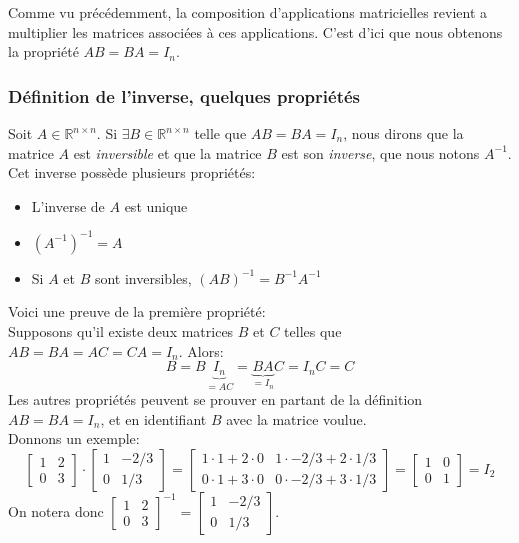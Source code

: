 \documentclass{article}
\newcommand{\R}{\mathbb{R}}
\newcommand{\cross}{\times}
\begin{document}
\noindent Comme vu précédemment, la composition d'applications matricielles revient a multiplier les matrices associées à ces applications. C'est d'ici que nous obtenons la propriété $AB=BA = I_n$.

\subsubsection{Définition de l'inverse, quelques propriétés}
\noindent Soit $A \in \R^{n \cross n}$. Si $\exists B \in \R^{n \cross n}$ telle que $AB=BA=I_n$, nous dirons que la matrice $A$ est \textit{inversible} et que la matrice $B$ est son \textit{inverse}, que nous notons $A^{-1}$. \\

\noindent Cet inverse possède plusieurs propriétés:
\begin{itemize}
    \item L'inverse de $A$ est unique
    \item $(A^{-1})^{-1} = A$
    \item Si $A$ et $B$ sont inversibles, $(AB)^{-1} = B^{-1} A^{-1}$
\end{itemize}

\noindent Voici une preuve de la première propriété:\\
Supposons qu'il existe deux matrices $B$ et $C$ telles que $AB=BA=AC=CA=I_n$. Alors:
$$B = B\underbrace{I_n}_{=AC} = \underbrace{BA}_{=I_n}C = I_n C = C$$
Les autres propriétés peuvent se prouver en partant de la définition $AB=BA=I_n$, et en identifiant $B$ avec la matrice voulue. \\

\noindent Donnons un exemple:
$$\begin{bmatrix} 1 & 2 \\ 0 & 3 \end{bmatrix} \cdot \begin{bmatrix} 1 & -2/3 \\ 0 & 1/3 \end{bmatrix} = \begin{bmatrix} 1\cdot 1 + 2\cdot 0 & 1\cdot -2/3 + 2\cdot 1/3 \\ 0\cdot 1 + 3\cdot 0 & 0\cdot -2/3 + 3\cdot 1/3 \end{bmatrix} = \begin{bmatrix} 1 & 0 \\ 0 & 1 \end{bmatrix} = I_2$$
On notera donc $\begin{bmatrix} 1 & 2 \\ 0 & 3 \end{bmatrix}^{-1} = \begin{bmatrix} 1 & -2/3 \\ 0 & 1/3 \end{bmatrix}$. \\
\end{document}
